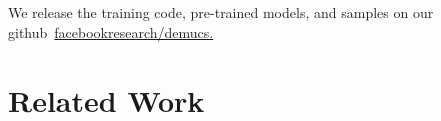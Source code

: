 \documentclass{article}
\begin{document}
We release the training code, pre-trained models, and samples on our github~\href{https://github.com/facebookresearch/demucs}{facebookresearch/demucs.}




\section{Related Work}
\label{sec:related}
\end{document}
